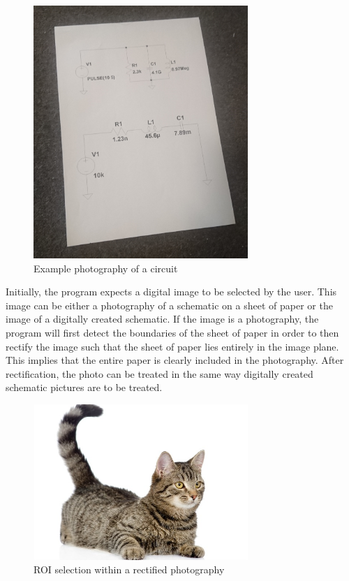 \documentclass[10pt,twocolumn,letterpaper]{article}
\begin{document}
\begin{figure}[!ht]
\includegraphics[width = 3.2in]{img/S04.JPG}
\caption{Example photography of a circuit}
\label{fig:c2}
\end{figure}

\par
Initially, the program expects a digital image to be selected by the user. This image can be either a photography of a schematic on a sheet of paper or the image of a digitally created schematic. If the image is a photography, the program will first detect the boundaries of the sheet of paper in order to then rectify the image such that the sheet of paper lies entirely in the image plane. This implies that the entire paper is clearly included in the photography. After rectification, the photo can be treated in the same way digitally created schematic pictures are to be treated.
\par

\begin{figure}[!ht]
\includegraphics[width = 3.2in]{img/cat.jpg}
\caption{ROI selection within a rectified photography}
\label{fig:c3}
\end{figure}
\end{document}
